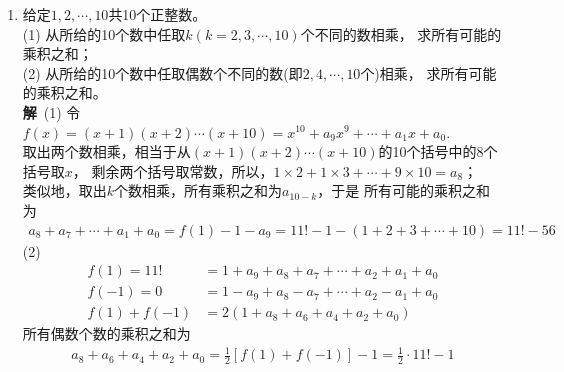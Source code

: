 \begin{enumerate}[label={【\textbf{例\thechapter.\arabic*}】},
 leftmargin=\inteval{\myenumleftmargin}pt,
 itemsep=\inteval{\myenumitempsep}pt,
 itemindent=\inteval{\myenumitemindent}pt]
\item 给定$ 1,2,\cdots ,10 $共10个正整数。\\
(1) 从所给的10个数中任取$ k(k=2,3,\cdots,10) $个不同的数相乘，
求所有可能的乘积之和；\\
(2) 从所给的10个数中任取偶数个不同的数(即$ 2,4,\cdots,10 $个)相乘，
求所有可能的乘积之和。\\
\textbf{解}\ (1) 令$ f(x)=(x+1)(x+2)\cdots (x+10)=x^{10}+a_9x^9+\cdots 
+a_1x+a_0 $.\\
取出两个数相乘，相当于从$ (x+1)(x+2)\cdots (x+10) $的10个括号中的8个括号取$ x $，
剩余两个括号取常数，所以，$ 1\times 2+1\times3+\cdots+9\times 10=a_8 $；\\
类似地，取出$ k $个数相乘，所有乘积之和为$ a_{10-k} $，于是
所有可能的乘积之和为
\begin{gather*}
    a_8+a_7+\cdots+a_1+a_0=f(1)-1-a_9=11!-1-(1+2+3+\cdots+10)=11!-56
\end{gather*}
(2) 
\begin{align*}
    f(1) = 11!&=1+a_9+a_8+a_7+\cdots+a_2+a_1+a_0 \\
    f(-1)=0   &=1-a_9+a_8-a_7+\cdots +a_2-a_1+a_0 \\
    f(1)+f(-1)&=2(1+a_8+a_6+a_4+a_2+a_0) 
\end{align*}
所有偶数个数的乘积之和为
\begin{align*}
    a_8+a_6+a_4+a_2+a_0=\frac{1}{2}\left[f(1)+f(-1)\right]-1=
    \frac{1}{2}\cdot 11!-1
\end{align*}


\end{enumerate}
